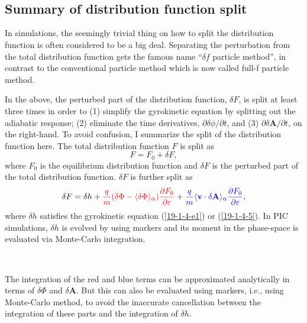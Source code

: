 \documentclass{article}
\newcommand{\tmcolor}[2]{{\color{#1}{#2}}}
\begin{document}
\

\

\subsection{Summary of distribution function split}\label{2023-10-31-p1}

In simulations, the seemingly trivial thing on how to split the distribution
function is often considered to be a big deal. Separating the perturbation
from the total distribution function gets the famous name ``$\delta f$
particle method'', in contrast to the conventional particle method which is
now called full-f particle method.

In the above, the perturbed part of the distribution function, $\delta F$, is
split at least three times in order to (1) simplify the gyrokinetic equation
by splitting out the adiabatic response; (2) eliminate the time derivatives,
$\partial \delta \phi / \partial t$, and (3) $\partial \delta \mathbf{A}/
\partial t$, on the right-hand. To avoid confusion, I summarize the split of
the distribution function here. The total distribution function $F$ is split
as
\begin{equation}
  \label{19-1-4-6} F = F_0 + \delta F,
\end{equation}
where $F_0$ is the equilibrium distribution function and $\delta F$ is the
perturbed part of the total distribution function. $\delta F$ is further split
as
\begin{equation}
  \label{19-1-3-e2} \delta F = \delta h + \tmcolor{red}{\frac{q}{m} (\delta
  \Phi - \langle \delta \Phi \rangle_{\alpha}) \frac{\partial F_0}{\partial
  \varepsilon}} + \tmcolor{blue}{\frac{q}{m} \langle \mathbf{v} \cdot \delta
  \mathbf{A} \rangle_{\alpha} \frac{\partial F_0}{\partial \varepsilon}},
\end{equation}
where $\delta h$ satisfies the gyrokinetic equation (\ref{19-1-4-e1}) or
(\ref{19-1-4-5}). In PIC simulations, $\delta h$ is evolved by using markers
and its moment in the phase-space is evaluated via Monte-Carlo integration.

\

The integration of the red and blue terms can be approximated analytically in
terms of $\delta \Phi$ and $\delta \mathbf{A}$. But this can also be evaluated
using markers, i.e., using Monte-Carlo method, to avoid the inaccurate
cancellation between the integration of these parts and the integration of
$\delta h$.

\
\end{document}
